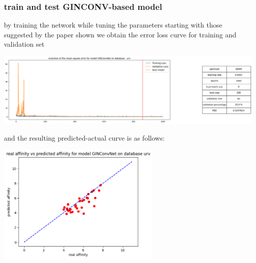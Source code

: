 \documentclass[11pt, a4paper]{article}
\begin{document}
        \subsubsection{train and test GINCONV-based model}
        by training the network while tuning the parameters starting with those suggested by the paper shown we obtain the error loss curve for training and validation set 
        \begin{center}
            \includegraphics[width=1.0\textwidth]{train_test_plots/URV GINCONV train.png}
        \end{center}
        and the resulting predicted-actual curve is as follows:
        \begin{center}
            \includegraphics[width=0.6\textwidth]{train_test_plots/URV GINCONV test.png}
        \end{center}
    
\end{document}
